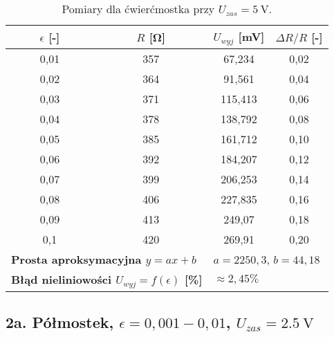 \documentclass[12pt, a4paper]{article}
\begin{document}
	\begin{table}[H]
		\centering
		\caption{Pomiary dla ćwierćmostka przy $U_{zas} = \SI{5}{\volt}$.}
		\begin{tabular}{cccc}
			\toprule
			$\epsilon$ [-] & $R$ [\si{\ohm}] & $U_{wyj}$ [\si{\milli\volt}] & $\Delta R/R$ [-] \\
			\midrule
			0,01 & 357 & 67,234 & 0,02 \\
			0,02 & 364 & 91,561 & 0,04 \\
			0,03 & 371 & 115,413 & 0,06 \\
			0,04 & 378 & 138,792 & 0,08 \\
			0,05 & 385 & 161,712 & 0,10 \\
			0,06 & 392 & 184,207 & 0,12 \\
			0,07 & 399 & 206,253 & 0,14 \\
			0,08 & 406 & 227,835 & 0,16 \\
			0,09 & 413 & 249,07 & 0,18 \\
			0,1 & 420 & 269,91 & 0,20 \\
			\midrule
			\multicolumn{2}{l}{\textbf{Prosta aproksymacyjna $y = ax + b$}} & \multicolumn{2}{l}{$a = 2250,3$, $b = 44,18$} \\
			\multicolumn{2}{l}{\textbf{Błąd nieliniowości $U_{wyj} = f(\epsilon)$ [\%]}} & \multicolumn{2}{l}{$\approx 2,45 \%$} \\
			\bottomrule
		\end{tabular}
	\end{table}
	
	\newpage
	\subsection{2a. Półmostek, $\epsilon = 0,001-0,01$, $U_{zas} = \SI{2.5}{\volt}$}
	
\end{document}
